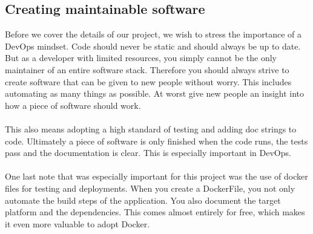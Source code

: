 \documentclass[12pt]{article}
\begin{document}
\subsection{Creating maintainable software}
Before we cover the details of our project, we wish to stress the importance of a DevOps mindset. Code should never be static and should always be up to date. But as a developer with limited resources, you simply cannot be the only maintainer of an entire software stack. Therefore you should always strive to create software that can be given to new people without worry. This includes automating as many things as possible. At worst give new people an insight into how a piece of software should work. \\\\
This also means adopting a high standard of testing and adding doc strings to code. Ultimately a piece of software is only finished when the code runs, the tests pass and the documentation is clear. This is especially important in DevOps.
\\\\
One last note that was especially important for this project was the use of docker files for testing and deployments. When you create a DockerFile, you not only automate the build steps of the application. You also document the target platform and the dependencies. This comes almost entirely for free, which makes it even more valuable to adopt Docker. 

\end{document}
